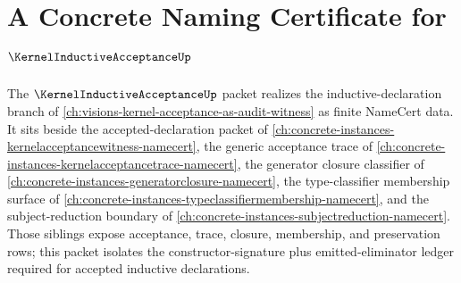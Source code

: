 \chapter{A Concrete Naming Certificate for $\KernelInductiveAcceptanceUp$}
\label{ch:concrete-instances-kernelinductiveacceptance-namecert}

The $\KernelInductiveAcceptanceUp$ packet realizes the inductive-declaration branch of \autoref{ch:visions-kernel-acceptance-as-audit-witness} as finite NameCert data. It sits beside the accepted-declaration packet of \autoref{ch:concrete-instances-kernelacceptancewitness-namecert}, the generic acceptance trace of \autoref{ch:concrete-instances-kernelacceptancetrace-namecert}, the generator closure classifier of \autoref{ch:concrete-instances-generatorclosure-namecert}, the type-classifier membership surface of \autoref{ch:concrete-instances-typeclassifiermembership-namecert}, and the subject-reduction boundary of \autoref{ch:concrete-instances-subjectreduction-namecert}. Those siblings expose acceptance, trace, closure, membership, and preservation rows; this packet isolates the constructor-signature plus emitted-eliminator ledger required for accepted inductive declarations.

